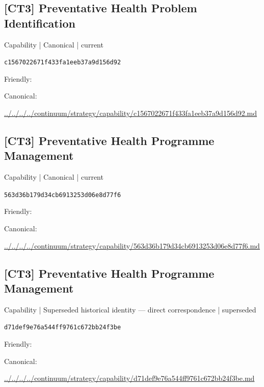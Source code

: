 \documentclass[10pt,a4paper]{article}
\begin{document}
\subsection*{[CT3] Preventative Health Problem Identification}
{\small Capability | Canonical | current}\par
\texttt{c1567022671f433fa1eeb37a9d156d92}\par
Friendly: \par
Canonical: \par
{\footnotesize\url{../../../../continuum/strategy/capability/c1567022671f433fa1eeb37a9d156d92.md}}\par
\subsection*{[CT3] Preventative Health Programme Management}
{\small Capability | Canonical | current}\par
\texttt{563d36b179d34cb6913253d06e8d77f6}\par
Friendly: \par
Canonical: \par
{\footnotesize\url{../../../../continuum/strategy/capability/563d36b179d34cb6913253d06e8d77f6.md}}\par
\subsection*{[CT3] Preventative Health Programme Management}
{\small Capability | Superseded historical identity — direct correspondence | superseded}\par
\texttt{d71def9e76a544ff9761c672bb24f3be}\par
Friendly: \par
Canonical: \par
{\footnotesize\url{../../../../continuum/strategy/capability/d71def9e76a544ff9761c672bb24f3be.md}}\par
\end{document}
